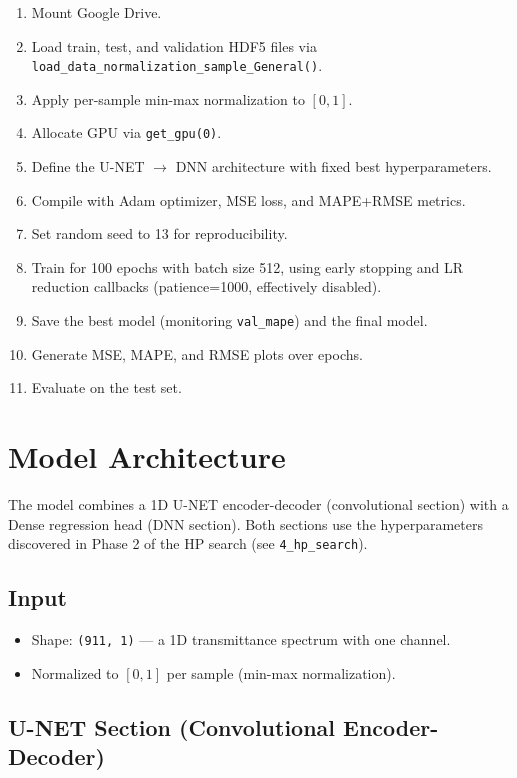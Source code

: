 \documentclass[11pt,a4paper]{article}
\begin{document}
\begin{enumerate}
    \item Mount Google Drive.
    \item Load train, test, and validation HDF5 files via {\tt load\_data\_normalization\_sample\_General()}.
    \item Apply per-sample min-max normalization to $[0, 1]$.
    \item Allocate GPU via {\tt get\_gpu(0)}.
    \item Define the U-NET $\rightarrow$ DNN architecture with fixed best hyperparameters.
    \item Compile with Adam optimizer, MSE loss, and MAPE+RMSE metrics.
    \item Set random seed to 13 for reproducibility.
    \item Train for 100 epochs with batch size 512, using early stopping and LR reduction callbacks (patience=1000, effectively disabled).
    \item Save the best model (monitoring \texttt{val\_mape}) and the final model.
    \item Generate MSE, MAPE, and RMSE plots over epochs.
    \item Evaluate on the test set.
\end{enumerate}

\section{Model Architecture}

The model combines a 1D U-NET encoder-decoder (convolutional section) with a Dense regression head (DNN section). Both sections use the hyperparameters discovered in Phase 2 of the HP search (see \texttt{4\_hp\_search}).

\subsection{Input}

\begin{itemize}
    \item Shape: \texttt{(911, 1)} — a 1D transmittance spectrum with one channel.
    \item Normalized to $[0, 1]$ per sample (min-max normalization).
\end{itemize}

\subsection{U-NET Section (Convolutional Encoder-Decoder)}
\end{document}
